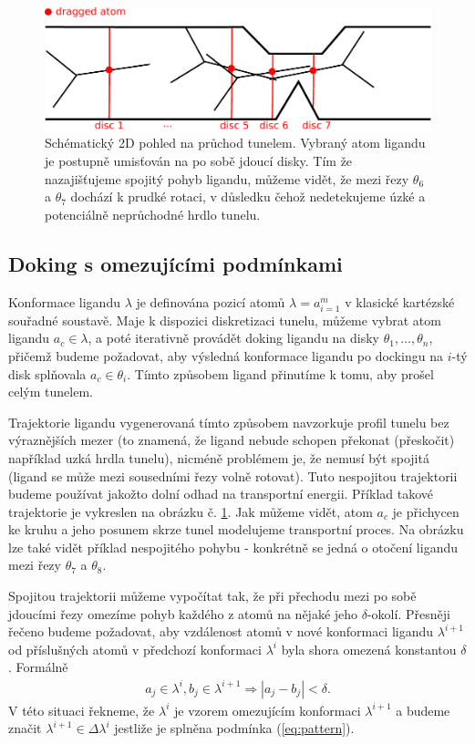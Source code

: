 \begin{figure}[t]
\centering
\includegraphics[width=.8\hsize]{img/tun.pdf}
\caption{Schématický 2D pohled na průchod tunelem. Vybraný atom ligandu je
postupně umisťován na po sobě jdoucí disky. Tím že nazajišťujeme spojitý pohyb
ligandu, můžeme vidět, že mezi řezy $\theta_6$ a $\theta_7$ dochází k prudké rotaci, v
důsledku čehož nedetekujeme úzké a potenciálně neprůchodné hrdlo tunelu.}
\label{fig:lower-bound}
\end{figure}





\subsection{Doking s omezujícími podmínkami}
Konformace ligandu $ \lambda $ je definována pozicí atomů
$ \lambda = {a}^m_{i = 1} $ v klasické kartézské souřadné soustavě. Maje
k dispozici diskretizaci tunelu, můžeme vybrat atom ligandu $ a_c \in \lambda $,
a poté iterativně provádět doking ligandu na disky $ \theta_1, \dots, \theta_n $,
přičemž budeme požadovat, aby výsledná konformace ligandu po dockingu na
$ i $-tý disk splňovala $ a_c \in \theta_i $. Tímto způsobem ligand přinutíme
k tomu, aby prošel celým tunelem.

Trajektorie ligandu vygenerovaná tímto způsobem navzorkuje profil tunelu bez
výraznějších mezer (to znamená, že ligand nebude schopen překonat (přeskočit) například
uzká hrdla tunelu), nicméně problémem je, že nemusí být spojitá (ligand se
může mezi sousedními řezy volně rotovat). Tuto nespojitou trajektorii budeme
používat jakožto dolní odhad na transportní energii. Příklad takové trajektorie
je vykreslen na obrázku č. \ref{fig:lower-bound}. Jak můžeme vidět, atom $ a_c $
je přichycen ke kruhu a jeho posunem skrze tunel modelujeme transportní
proces. Na obrázku lze také vidět příklad nespojitého pohybu - konkrétně
se jedná o otočení ligandu mezi řezy $ \theta_7$ a $\theta_8$.

Spojitou trajektorii můžeme vypočítat tak, že při přechodu mezi po sobě jdoucími
řezy omezíme pohyb každého z atomů na nějaké jeho $ \delta $-okolí. Přesněji řečeno
budeme požadovat, aby vzdálenost atomů v nové konformaci ligandu $ \lambda^{i + 1} $
od příslušných atomů v předchozí konformaci $ \lambda^{i} $ byla shora omezená
konstantou $ \delta $. Formálně
\begin{align}
    a_j \in \lambda^{i}, b_j \in \lambda^{i + 1} \Rightarrow |a_j - b_j| < \delta.
    \label{eq:pattern}
\end{align}
V této situaci řekneme, že $ \lambda^i $ je vzorem omezujícím konformaci
$ \lambda^{i+1} $ a budeme značit $ \lambda^{i+1} \in \Delta \lambda^i $ jestliže
je splněna podmínka (\ref{eq:pattern}).

